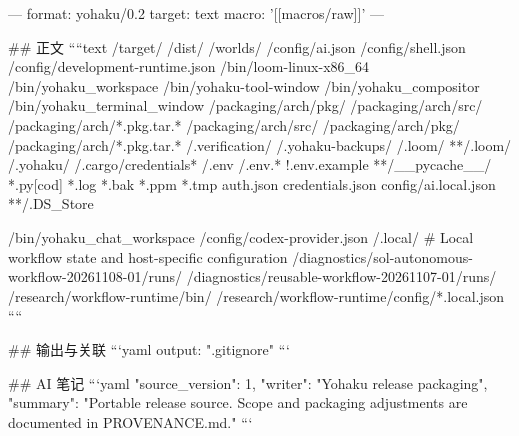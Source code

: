 ---
format: yohaku/0.2
target: text
macro: '[[macros/raw]]'
---

## 正文
````text
/target/
/dist/
/worlds/
/config/ai.json
/config/shell.json
/config/development-runtime.json
/bin/loom-linux-x86_64
/bin/yohaku_workspace
/bin/yohaku-tool-window
/bin/yohaku_compositor
/bin/yohaku_terminal_window
/packaging/arch/pkg/
/packaging/arch/src/
/packaging/arch/*.pkg.tar.*
/packaging/arch/src/
/packaging/arch/pkg/
/packaging/arch/*.pkg.tar.*
/.verification/
/.yohaku-backups/
/.loom/
**/.loom/
/.yohaku/
/.cargo/credentials*
/.env
/.env.*
!.env.example
**/__pycache__/
*.py[cod]
*.log
*.bak
*.ppm
*.tmp
auth.json
credentials.json
config/ai.local.json
**/.DS_Store

/bin/yohaku_chat_workspace
/config/codex-provider.json
/.local/
# Local workflow state and host-specific configuration
/diagnostics/sol-autonomous-workflow-20261108-01/runs/
/diagnostics/reusable-workflow-20261107-01/runs/
/research/workflow-runtime/bin/
/research/workflow-runtime/config/*.local.json
````

## 输出与关联
```yaml
output: ".gitignore"
```

## AI 笔记
```yaml
{"source_version": 1, "writer": "Yohaku release packaging", "summary": "Portable release source. Scope and packaging adjustments are documented in PROVENANCE.md."}
```
